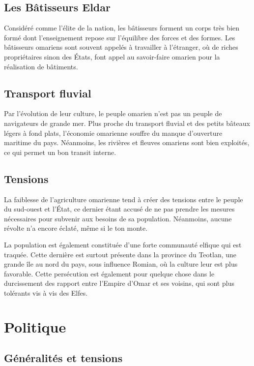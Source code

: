 \documentclass[french, a4paper, 12pt]{article}
\begin{document}
\subsection{Les Bâtisseurs Eldar}

Considéré comme l'élite de la nation, les bâtisseurs forment un corps très bien formé dont l'enseignement repose sur l'équilibre des forces et des formes. Les bâtisseurs omariens sont souvent appelés à travailler à l'étranger, où de riches propriétaires sinon des États, font appel au savoir-faire omarien pour la réalisation de bâtiments.


\subsection{Transport fluvial}
	
Par l'évolution de leur culture, le peuple omarien n'est pas un peuple de navigateurs de grande mer. Plus proche du transport fluvial et des petits bâteaux légers à fond plats, l'économie omarienne souffre du manque d'ouverture maritime du pays. Néanmoins, les rivières et fleuves omariens sont bien exploités, ce qui permet un bon transit interne.

\subsection{Tensions}

La faiblesse de l'agriculture omarienne tend à créer des tensions entre le peuple du sud-ouest et l'État, ce dernier étant accusé de ne pas prendre les mesures nécessaires pour subvenir aux besoins de sa population. Néanmoins, aucune révolte n'a encore éclaté, même si le ton monte.

La population est également constituée d'une forte communauté elfique qui est traquée. Cette dernière est surtout présente dans la province du Teotlan, une grande île au nord du pays, sous influence Romian, où la culture leur est plus favorable. Cette persécution est également pour quelque chose dans le durcissement des rapport entre l'Empire d'Omar et ses voisins, qui sont plus tolérants vis à vis des Elfes.

\section{Politique}

\subsection{Généralités et tensions}
\end{document}
